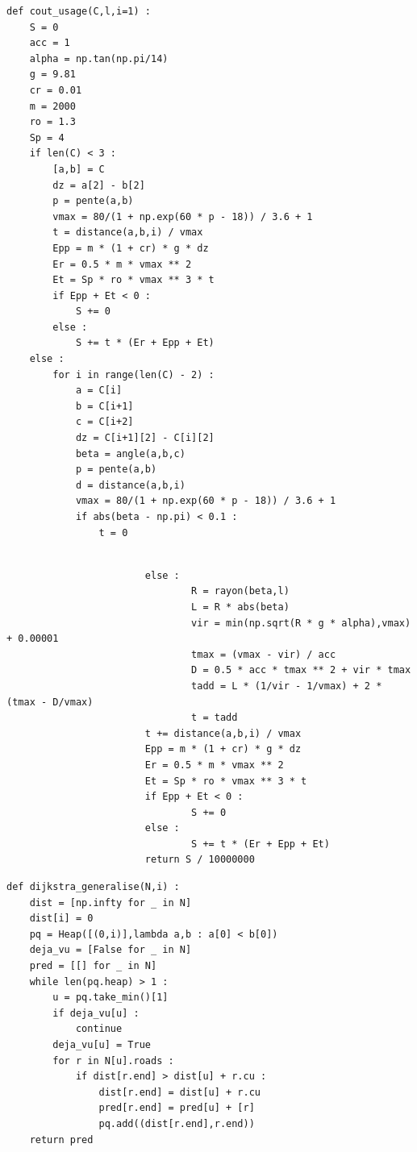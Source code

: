\documentclass{beamer}[11pt]
\begin{document}
		\begin{frame}[containsverbatim]
\begin{lstlisting}[basicstyle=\tiny]
def cout_usage(C,l,i=1) :
    S = 0
    acc = 1
    alpha = np.tan(np.pi/14)
    g = 9.81
    cr = 0.01
    m = 2000
    ro = 1.3
    Sp = 4
    if len(C) < 3 :
        [a,b] = C
        dz = a[2] - b[2]
        p = pente(a,b)
        vmax = 80/(1 + np.exp(60 * p - 18)) / 3.6 + 1
        t = distance(a,b,i) / vmax
        Epp = m * (1 + cr) * g * dz
        Er = 0.5 * m * vmax ** 2
        Et = Sp * ro * vmax ** 3 * t
        if Epp + Et < 0 :
            S += 0
        else :
            S += t * (Er + Epp + Et)
    else :
        for i in range(len(C) - 2) :
            a = C[i]
            b = C[i+1]
            c = C[i+2]
            dz = C[i+1][2] - C[i][2]
            beta = angle(a,b,c)
            p = pente(a,b)
            d = distance(a,b,i)
            vmax = 80/(1 + np.exp(60 * p - 18)) / 3.6 + 1
            if abs(beta - np.pi) < 0.1 :
                t = 0
\end{lstlisting}
		\end{frame}

		\begin{frame}[containsverbatim]
\begin{lstlisting}

						else :
								R = rayon(beta,l)
								L = R * abs(beta)
								vir = min(np.sqrt(R * g * alpha),vmax) + 0.00001
								tmax = (vmax - vir) / acc
								D = 0.5 * acc * tmax ** 2 + vir * tmax
								tadd = L * (1/vir - 1/vmax) + 2 * (tmax - D/vmax)
								t = tadd
						t += distance(a,b,i) / vmax
						Epp = m * (1 + cr) * g * dz
						Er = 0.5 * m * vmax ** 2
						Et = Sp * ro * vmax ** 3 * t
						if Epp + Et < 0 :
								S += 0
						else :
								S += t * (Er + Epp + Et)
						return S / 10000000
\end{lstlisting}
		\end{frame}

		\begin{frame}[containsverbatim]
\begin{lstlisting}
def dijkstra_generalise(N,i) :
    dist = [np.infty for _ in N]
    dist[i] = 0
    pq = Heap([(0,i)],lambda a,b : a[0] < b[0])
    deja_vu = [False for _ in N]
    pred = [[] for _ in N]
    while len(pq.heap) > 1 :
        u = pq.take_min()[1]
        if deja_vu[u] :
            continue
        deja_vu[u] = True
        for r in N[u].roads :
            if dist[r.end] > dist[u] + r.cu :
                dist[r.end] = dist[u] + r.cu
                pred[r.end] = pred[u] + [r]
                pq.add((dist[r.end],r.end))
    return pred
\end{lstlisting}
		\end{frame}
\end{document}
